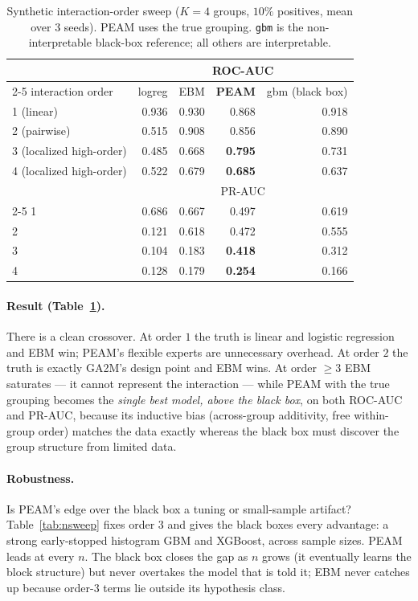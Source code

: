\documentclass{article}
\begin{document}
\begin{table}[t]
\centering
\caption{Synthetic interaction-order sweep ($K{=}4$ groups, $10\%$ positives,
mean over 3 seeds). PEAM uses the true grouping. \texttt{gbm} is the
non-interpretable black-box reference; all others are interpretable.}
\label{tab:order}
\begin{tabular}{lrrrr}
\toprule
 & \multicolumn{4}{c}{ROC-AUC} \\
\cmidrule(lr){2-5}
interaction order & logreg & EBM & \textbf{PEAM} & gbm (black box) \\
\midrule
1 (linear)                 & 0.936 & 0.930 & 0.868 & 0.918 \\
2 (pairwise)               & 0.515 & 0.908 & 0.856 & 0.890 \\
3 (localized high-order)   & 0.485 & 0.668 & \textbf{0.795} & 0.731 \\
4 (localized high-order)   & 0.522 & 0.679 & \textbf{0.685} & 0.637 \\
\midrule
 & \multicolumn{4}{c}{PR-AUC} \\
\cmidrule(lr){2-5}
1 & 0.686 & 0.667 & 0.497 & 0.619 \\
2 & 0.121 & 0.618 & 0.472 & 0.555 \\
3 & 0.104 & 0.183 & \textbf{0.418} & 0.312 \\
4 & 0.128 & 0.179 & \textbf{0.254} & 0.166 \\
\bottomrule
\end{tabular}
\end{table}

\paragraph{Result (Table~\ref{tab:order}).} There is a clean crossover. At order
$1$ the truth is linear and logistic regression and EBM win; PEAM's flexible
experts are unnecessary overhead. At order $2$ the truth is exactly GA2M's design
point and EBM wins. At order $\geq 3$ EBM saturates --- it cannot represent the
interaction --- while PEAM with the true grouping becomes the \emph{single best
model, above the black box}, on both ROC-AUC and PR-AUC, because its inductive
bias (across-group additivity, free within-group order) matches the data exactly
whereas the black box must discover the group structure from limited data.

\paragraph{Robustness.} Is PEAM's edge over the black box a tuning or
small-sample artifact? Table~\ref{tab:nsweep} fixes order $3$ and gives the black
boxes every advantage: a strong early-stopped histogram GBM and XGBoost, across
sample sizes. PEAM leads at every $n$. The black box closes the gap as $n$ grows
(it eventually learns the block structure) but never overtakes the model that is
told it; EBM never catches up because order-3 terms lie outside its hypothesis
class.
\end{document}

